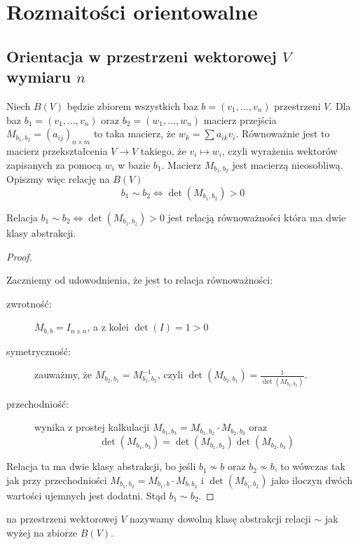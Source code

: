 \section{Rozmaitości orientowalne}

\subsection{Orientacja w przestrzeni wektorowej $V$ wymiaru $n$}

Niech $B(V)$ będzie zbiorem wszystkich baz $b=(v_1,...,v_n)$ przestrzeni $V$. Dla baz $b_1=(v_1,...,v_n)$ oraz $b_2=(w_1,...,w_n)$ macierz przejścia $M_{b_1,b_2}=(a_{ij})_{n\times m}$ to taka macierz, że $w_k=\sum a_{ik}v_i$. Równoważnie jest to macierz przekształcenia $V\to V$ takiego, że $v_i\mapsto w_i$, czyli wyrażenia wektorów zapisanych za pomocą $w_i$ w bazie $b_1$. Macierz $M_{b_1,b_2}$ jest macierzą nieosobliwą. Opiszmy więc relację na $B(V)$
$$b_1\sim b_2\iff \det(M_{b_1,b_2})>0$$

\begin{lemma}
  Relacja $b_1\sim b_2\iff \det(M_{b_1,b_2})>0$ jest relacją równoważności która ma dwie klasy abstrakcji.
\end{lemma}

\begin{proof}$ $

  Zaczniemy od udowodnienia, że jest to relacja równoważności:
  \begin{description}
    \item[zwrotność:] $M_{b,b}=I_{n\times n}$, a z kolei $\det(I)=1>0$
    \item[symetryczność:] zauważmy, że $M_{b_2,b_1}=M_{b_1,b_2}^{-1}$, czyli $\det(M_{b_2,b_1})=\frac{1}{\det(M_{b_1,b_2})}$.
    \item[przechodniość:] wynika z prostej kalkulacji $M_{b_1,b_3}=M_{b_1,b_2}\cdot M_{b_2,b_3}$ oraz
      $$\det(M_{b_1,b_3})=\det(M_{b_1,b_2})\det(M_{b_2,b_3})$$
  \end{description}

  Relacja ta ma dwie klasy abstrakcji, bo jeśli $b_1\not\sim b$ oraz $b_2\not\sim b$, to wówczas tak jak przy przechodniości $M_{b_1,b_2}=M_{b_1,b}\cdot M_{b,b_2}$ i $\det(M_{b_1,b_2})$ jako iloczyn dwóch wartości ujemnych jest dodatni. Stąd $b_1\sim b_2$.
\end{proof}

\begin{definition}
   na przestrzeni wektorowej $V$ nazywamy dowolną klasę abstrakcji relacji $\sim$ jak wyżej na zbiorze $B(V)$.
\end{definition}

